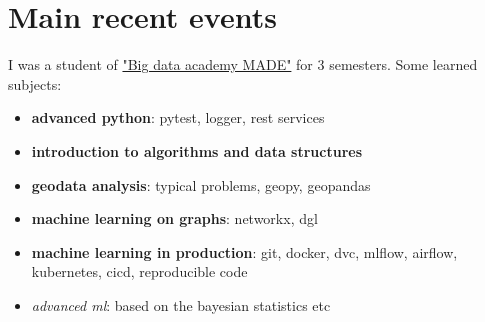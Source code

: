 \documentclass[letterpaper]{twentysecondcv} %
\begin{document}

\section{Main recent events}



\iffalse
\begin{twenty}
        \twentyitem
        {Sep 2020 -}{Dec 2022}{Big data academy}
        {\href{http://data.mail.ru/}{mail.ru} }{student}
        {
            {\begin{itemize}
                \item learned subjects:
                    {\begin{itemize}
                    \item \textbf{advanced python}: pytest, logger, rest services
                    \item \textbf{introduction to algorithms and data structures}
                    \item \textbf{geodata analysis}: typical problems, geopy, geopandas
                    \item \textbf{machine learning on graphs}: networkx, dgl
                    \item \textbf{machine learning in production}: git, docker, dvc, mlflow, airflow, kubernetes, cicd, reproducible code
                    \item \emph{advanced ml}: based on the bayesian statistics etc
                    \end{itemize}}

            \end{itemize}}
        }
        \\
\end{twenty}
\fi

I was a student of \href{https://data.vk.company/}{"Big data academy MADE"} for 3 semesters. Some learned subjects:
    {\begin{itemize}
        \item \textbf{advanced python}: pytest, logger, rest services
        \item \textbf{introduction to algorithms and data structures}
        \item \textbf{geodata analysis}: typical problems, geopy, geopandas
        \item \textbf{machine learning on graphs}: networkx, dgl
        \item \textbf{machine learning in production}: git, docker, dvc, mlflow, airflow, kubernetes, cicd, reproducible code
        \item \emph{advanced ml}: based on the bayesian statistics etc
    \end{itemize}
    }
\end{document}
